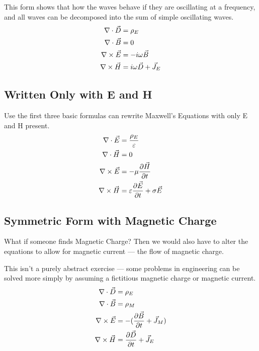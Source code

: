 \documentclass{article}
\begin{document}
	This form shows that how the waves behave if they are oscillating at a frequency, and all waves can be decomposed into the sum of simple oscillating waves.
	\begin{align*}
		\nabla \cdot \vec{D} & = \rho_E
		\\
		\nabla \cdot \vec{B} & = 0
		\\
		\nabla \times \vec{E} & = - i \omega \vec{B}
		\\
		\nabla \times \vec{H} & = i \omega \vec{D} + \vec{J}_E
	\end{align*}
	
	\subsection{Written Only with E and H}
	Use the first three basic formulas can rewrite Maxwell's Equations with only E and H present.
	\begin{align*}
		\nabla \cdot \vec{E} & = \frac{\rho_E}{\varepsilon}
		\\
		\nabla \cdot \vec{H} & = 0
		\\
		\nabla \times \vec{E} & = - \mu \frac{\partial \vec{H}}{\partial t}
		\\
		\nabla \times \vec{H} & = \varepsilon \frac{\partial \vec{E}}{\partial t} + \sigma \vec{E}
	\end{align*}
	
	\subsection{Symmetric Form with Magnetic Charge}
	What if someone finds Magnetic Charge? Then we would also have to alter the equations to allow for magnetic current --- the flow of magnetic charge.
	
	This isn't a purely abstract exercise --- some problems in engineering can be solved more simply by assuming a fictitious magnetic charge or magnetic current.
	\begin{align*}
		\nabla \cdot \vec{D} & = \rho_E
		\\
		\nabla \cdot \vec{B} & = \rho_M
		\\
		\nabla \times \vec{E} & = - (\frac{\partial \vec{B}}{\partial t} + \vec{J}_M)
		\\
		\nabla \times \vec{H} & = \frac{\partial \vec{D}}{\partial t} + \vec{J}_E
	\end{align*}
	
\end{document}
